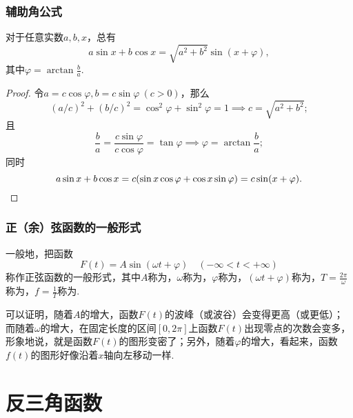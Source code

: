\subsubsection{辅助角公式}
\begin{theorem}[辅助角公式]
对于任意实数\(a,b,x\)，总有
\begin{equation}
a \sin x + b \cos x = \sqrt{a^2 + b^2} \sin(x + \varphi),
\end{equation}
其中\(\varphi = \arctan\frac{b}{a}\).
\begin{proof}
令\(a = c \cos\varphi,
b = c \sin\varphi\ (c>0)\)，那么
\[
\left(a/c\right)^2+\left(b/c\right)^2
=\cos^2\varphi+\sin^2\varphi
=1
\implies
c = \sqrt{a^2+b^2};
\]
且\[
\frac{b}{a} = \frac{c \sin\varphi}{c \cos\varphi} = \tan\varphi
\implies
\varphi = \arctan\frac{b}{a};
\]
同时
\[
a \sin x + b \cos x
= c (\sin x \cos\varphi + \cos x \sin\varphi)
= c \sin(x+\varphi).
\qedhere
\]
\end{proof}
\end{theorem}

\subsubsection{正（余）弦函数的一般形式}
\begin{definition}
一般地，把函数\[
F(t) = A \sin(\omega t + \varphi) \quad (-\infty<t<+\infty)
\]称作正弦函数的一般形式，其中\(A\)称为，\(\omega\)称为，\(\varphi\)称为，\((\omega t + \varphi)\)称为，\(T = \frac{2\pi}{\omega}\)称为，\(f = \frac{1}{T}\)称为.
\end{definition}
可以证明，随着\(A\)的增大，函数\(F(t)\)的波峰（或波谷）会变得更高（或更低）；而随着\(\omega\)的增大，在固定长度的区间\([0,2\pi]\)上函数\(F(t)\)出现零点的次数会变多，形象地说，就是函数\(F(t)\)的图形变密了；另外，随着\(\varphi\)的增大，看起来，函数\(f(t)\)的图形好像沿着\(x\)轴向左移动一样.

\section{反三角函数}
